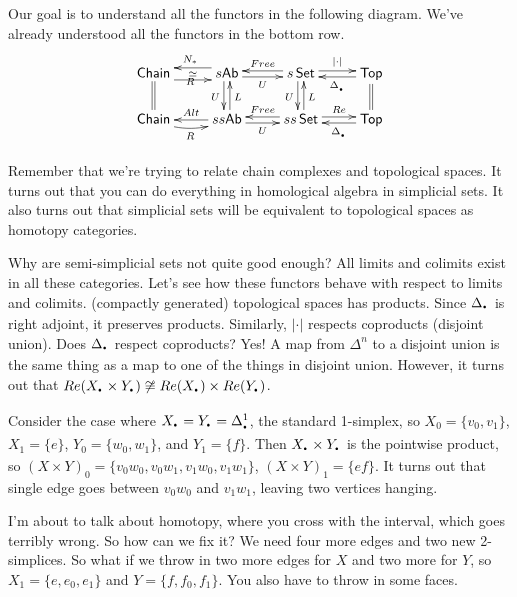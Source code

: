 
Our goal is to understand all the functors in the following diagram. We've already understood all the functors in the bottom row.
\[\xymatrix@R-.5pc{
 \chain \ar@{=}[d] \ar@<-1ex>[r] \ar@{}[r]_R|-\simeq & s\ab \ar@<-.5ex>[d]_U\ar@{<-}@<.5ex>[d]^L \ar@<-1ex>[l]_{N_*} \ar@<-.5ex>[r]_-U & s\set \ar@<-.5ex>[d]_U \ar@{<-}@<.5ex>[d]^L \ar@<-.5ex>[l]_-{Free} \ar@<.5ex>[r]^-{|\cdot|} & \top \ar@{=}[d] \ar@<.5ex>[l]^-{\Delta_\udot}\\
 \chain \ar@/_/[r]_R & ss\ab \ar[l]_-{Alt} \ar@<-.5ex>[r]_-U & ss\set \ar@<-.5ex>[l]_-{Free} \ar@<.5ex>[r]^-{Re} & \top \ar@<.5ex>[l]^-{\Delta_\udot}\\
}\]

Remember that we're trying to relate chain complexes and topological spaces. It turns out that you can do everything in homological algebra in simplicial sets. It also turns out that simplicial sets will be equivalent to topological spaces as homotopy categories.

Why are semi-simplicial sets not quite good enough? All limits and colimits exist in all these categories. Let's see how these functors behave with respect to limits and colimits. (compactly generated) topological spaces has products. Since $\Delta_\udot$ is right adjoint, it preserves products. Similarly, $|\cdot|$ respects coproducts (disjoint union). Does $\Delta_\udot$ respect coproducts? Yes! A map from $\Delta^n$ to a disjoint union is the same thing as a map to one of the things in disjoint union. However, it turns out that $Re(X_\udot\times Y_\udot)\not\cong Re(X_\udot)\times Re(Y_\udot)$.

Consider the case where $X_\udot=Y_\udot=\Delta_\udot^1$, the standard 1-simplex, so $X_0=\{v_0,v_1\}$, $X_1=\{e\}$, $Y_0=\{w_0,w_1\}$, and $Y_1=\{f\}$. Then $X_\udot\times Y_\udot$ is the pointwise product, so $(X\times Y)_0=\{v_0w_0,v_0w_1,v_1w_0,v_1w_1\}$, $(X\times Y)_1=\{ef\}$. It turns out that single edge goes between $v_0w_0$ and $v_1w_1$, leaving two vertices hanging.

I'm about to talk about homotopy, where you cross with the interval, which goes terribly wrong. So how can we fix it? We need four more edges and two new 2-simplices. So what if we throw in two more edges for $X$ and two more for $Y$, so $X_1=\{e,e_0,e_1\}$ and $Y=\{f,f_0,f_1\}$. You also have to throw in some faces.

